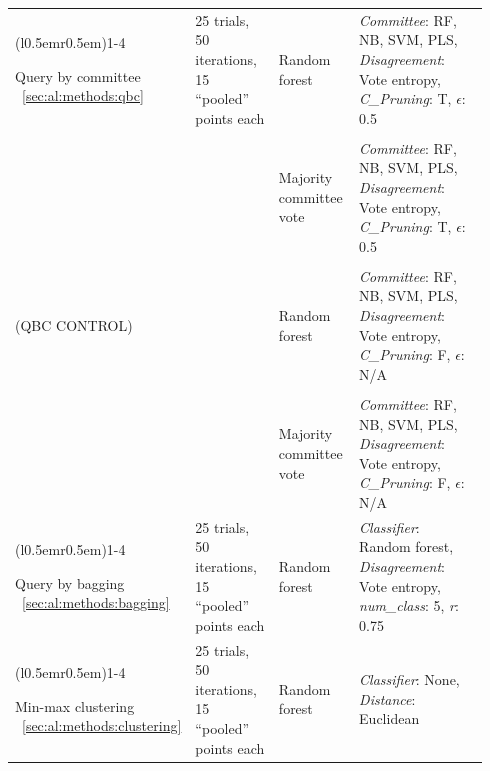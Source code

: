 \begin{longtable}{p{0.15\linewidth} p{0.21\linewidth} p{0.18\linewidth} 
p{0.4\linewidth}}
	\cmidrule[0.1pt](l{0.5em}r{0.5em}){1-4}
	
	Query by \newline committee ~\ref{sec:al:methods:qbc} & 
	25 trials, 50 iterations, 15 ``pooled'' points each & 
	Random forest &	
	\textit{Committee}: RF, NB, SVM, PLS, \newline 
	\textit{Disagreement}: Vote entropy, \newline 
	\textit{C\_Pruning}: T, $\epsilon$: 0.5 \\ & \\
	
	& & Majority \newline committee \newline vote &	
	\textit{Committee}: RF, NB, SVM, PLS, \newline 
	\textit{Disagreement}: Vote entropy, \newline 
	\textit{C\_Pruning}: T, $\epsilon$: 0.5 \\ & \\
	
	(QBC \newline CONTROL) & & Random forest &	
	\textit{Committee}: RF, NB, SVM, PLS, \newline 
	\textit{Disagreement}: Vote entropy, \newline 
	\textit{C\_Pruning}: F, $\epsilon$: N/A \\ & \\
	
	& & Majority \newline committee \newline vote &	
	\textit{Committee}: RF, NB, SVM, PLS, \newline 
	\textit{Disagreement}: Vote entropy, \newline 
	\textit{C\_Pruning}: F, $\epsilon$: N/A \\	
	
	\cmidrule[0.1pt](l{0.5em}r{0.5em}){1-4}	
	
	Query by \newline bagging ~\ref{sec:al:methods:bagging} & 
	25 trials, 50 iterations, 15 ``pooled'' points each & 
	Random forest &
	\textit{Classifier}: Random forest, \newline \textit{Disagreement}: Vote 
	entropy, \newline \textit{num\_class}: 5, \textit{r}: 0.75 \\
		
	\cmidrule[0.1pt](l{0.5em}r{0.5em}){1-4}	
	
	Min-max \newline clustering ~\ref{sec:al:methods:clustering} & 
	25 trials, 50 iterations, 15 ``pooled'' points each & 
	Random forest & 
	\textit{Classifier}: None, \newline \textit{Distance}: Euclidean \\
	
\end{longtable}
\bodyspacing

